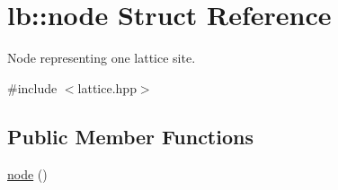 \hypertarget{structlb_1_1node}{\section{lb\-:\-:node \-Struct \-Reference}
\label{structlb_1_1node}
}


\-Node representing one lattice site.  




{\ttfamily \#include $<$lattice.\-hpp$>$}

\subsection*{\-Public \-Member \-Functions}
\begin{DoxyCompactItemize}
\item 
\hypertarget{structlb_1_1node_a6a968a5591778a16a8e513166ec5bebf}{\hyperlink{structlb_1_1node_a6a968a5591778a16a8e513166ec5bebf}{node} ()}\label{structlb_1_1node_a6a968a5591778a16a8e513166ec5bebf}


\end{DoxyCompactItemize}
